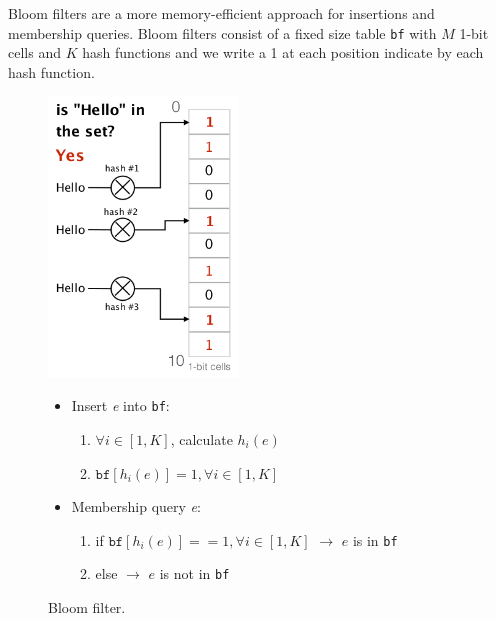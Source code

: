 \documentclass[11pt,oneside,a4paper]{article}
\begin{document}
Bloom filters are a more memory-efficient approach for insertions and membership queries. Bloom filters consist of a fixed size table \texttt{bf} with $M$ 1-bit cells and $K$ hash functions and we write a 1 at each position indicate by each hash function.

\begin{figure}[hb]
	\begin{minipage}[t]{.5\textwidth} 
		\vspace{0pt}
		\centering 
		\includegraphics[width=0.45\textwidth]{figures/bloom_filter}
		\caption{Bloom filter. 	\cite{advnet}}
		\label{fig:bloom_filter}
	\end{minipage} 
	\begin{minipage}[t]{.5\textwidth} 
		\vspace{10pt} 
		\begin{itemize}
			\setlength{\itemsep}{0pt}
			\setlength{\parskip}{0pt}
			\item Insert \textit{e} into \texttt{bf}: 
				\begin{enumerate}
					\item $\forall i \in [1,K]$, calculate $h_i(e)$
					\item $\texttt{bf}[h_i(e)] = 1, \forall i \in [1,K]$
				\end{enumerate}
			\item Membership query \textit{e}:
				\begin{enumerate}
					\item if $\texttt{bf}[h_i(e)] == 1, \forall i \in [1,K]$ 
					\newline $\rightarrow$ $e$ is in \texttt{bf}
					\item else 
					\newline $\rightarrow$ $e$ is not in \texttt{bf}
				\end{enumerate}
			\end{itemize}
	\end{minipage} 
\end{figure}
\end{document}
